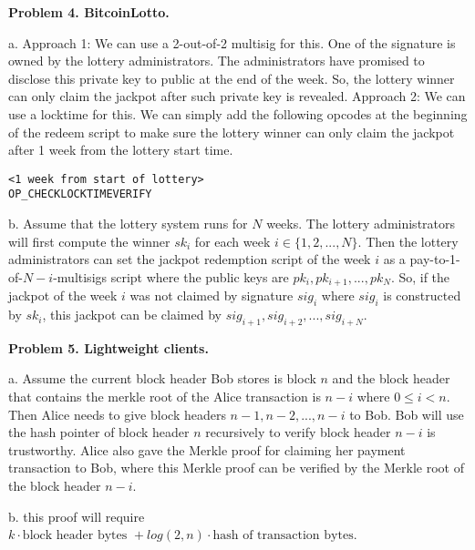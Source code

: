 \documentclass{article}
\begin{document}
\vspace{12pt}

\textbf{Problem 4. BitcoinLotto.}

\vspace{6pt}

a. Approach 1: We can use a 2-out-of-2 multisig for this. One of the signature is owned by the lottery administrators. The administrators have promised to disclose this private key to public at the end of the week. So, the lottery winner can only claim the jackpot after such private key is revealed. Approach 2: We can use a locktime for this. We can simply add the following opcodes at the beginning of the redeem script to make sure the lottery winner can only claim the jackpot after 1 week from the lottery start time. 

\begin{verbatim}
<1 week from start of lottery>
OP_CHECKLOCKTIMEVERIFY
\end{verbatim}

\vspace{6pt}

b. Assume that the lottery system runs for $N$ weeks. The lottery administrators will first compute the winner $sk_i$ for each week $i \in \{1, 2, ..., N\}$. Then the lottery administrators can set the jackpot redemption script of the week $i$ as a pay-to-1-of-${N -i}$-multisigs script where the public keys are $pk_i, pk_{i+1}, ..., pk_{N}$. So, if the jackpot of the week $i$ was not claimed by signature $sig_i$ where $sig_i$ is constructed by $sk_i$, this jackpot can be claimed by $sig_{i+1}, sig_{i+2}, ..., sig_{i+N}$.


\vspace{12pt}

\textbf{Problem 5. Lightweight clients.}

\vspace{6pt}

a. Assume the current block header Bob stores is block $n$ and the block header that contains the merkle root of the Alice transaction is $n-i$ where $0 \le i < n$. Then Alice needs to give block headers $n-1, n-2, ..., n-i$ to Bob. Bob will use the hash pointer of block header $n$ recursively to verify block header $n-i$ is trustworthy. Alice also gave the Merkle proof for claiming her payment transaction to Bob, where this Merkle proof can be verified by the Merkle root of the block header $n-i$. 

\vspace{6pt}

b. this proof will require $k \cdot \text{block header bytes } + log(2, n) \cdot \text{hash of transaction bytes}$.

\vspace{12pt}
\end{document}
